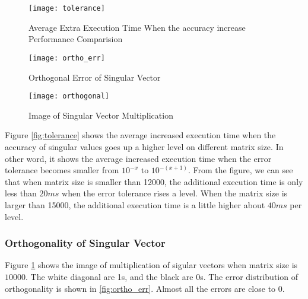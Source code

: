 \begin{figure}[hbpt]
\vspace{-0.3in}
\begin{minipage}[t]{0.33\linewidth}
\centering
\texttt{[image: tolerance]}
\vspace{-0.1in}
\caption{Average Extra Execution Time When the accuracy increase Performance Comparision}
\label{fig:tolerance}
\end{minipage}%
\begin{minipage}[t]{0.33\linewidth}
\centering
\texttt{[image: ortho\_err]}
\vspace{-0.1in}
\caption{Orthogonal Error of Singular Vector}
\label{fig:ortho_err}
\end{minipage}
\begin{minipage}[t]{0.33\linewidth}
\centering
\texttt{[image: orthogonal]}
\vspace{-0.1in}
\caption{Image of Singular Vector Multiplication}
\label{fig:ortho_img}
\end{minipage}
\vspace{-0.2in}
\end{figure}
Figure \ref{fig:tolerance} shows the average increased execution time when the accuracy of singular values goes up a higher level on different matrix size.
In other word, it shows the average increased execution time when the error tolerance becomes smaller from $10^{-x}$ to $10^{-(x+1)}$.
From the figure, we can see that when matrix size is smaller than 12000, the additional execution time is only less than $20 ms$ when the error tolerance rises a level.
When the matrix size is larger than 15000, the additional execution time is a little higher about $40 ms$ per level.

\subsubsection{Orthogonality of Singular Vector}
Figure \ref{fig:ortho_img} shows the image of multiplication of sigular vectors when matrix size is $10000$.
The white diagonal are 1s, and the black are 0s. 
The error distribution of orthogonality is shown in \ref{fig:ortho_err}. Almost all the errors are close to 0.
